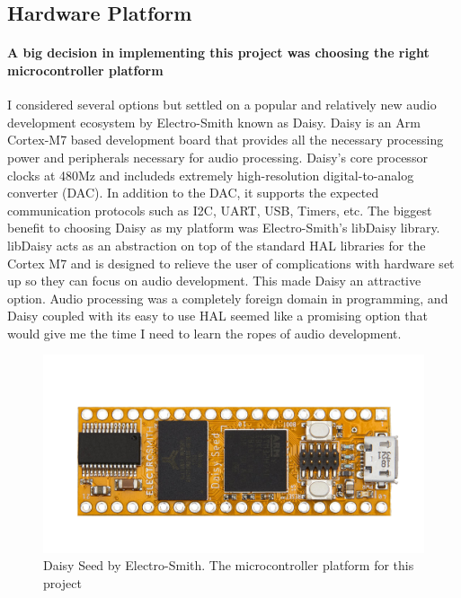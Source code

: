 \documentclass[acmlarge,screen]{acmart}
\begin{document}
\subsection{Hardware Platform}
	\paragraph{A big decision in implementing this project was choosing the right microcontroller platform} I considered several options but settled on a popular and relatively new audio development ecosystem by Electro-Smith known as Daisy. Daisy is an Arm Cortex-M7 based development board that provides all the necessary processing power and peripherals necessary for audio processing. Daisy's core processor clocks at 480Mz and includeds extremely high-resolution digital-to-analog converter (DAC). In addition to the DAC, it supports the expected communication protocols such as I2C, UART, USB, Timers, etc. The biggest benefit to choosing Daisy as my platform was Electro-Smith's libDaisy library. libDaisy acts as an abstraction on top of the standard HAL libraries for the Cortex M7 and is designed to relieve the user of complications with hardware set up so they can focus on audio development. \cite{electro-smith} This made Daisy an attractive option. Audio processing was a completely foreign domain in programming, and Daisy coupled with its easy to use HAL seemed like a promising option that would give me the time I need to learn the ropes of audio development.
	
	\begin{figure}
		\includegraphics[width=\linewidth]{daisy_promo_pic}
		\caption{Daisy Seed by Electro-Smith. The microcontroller platform for this project}
		\centering
	\end{figure}
\end{document}

